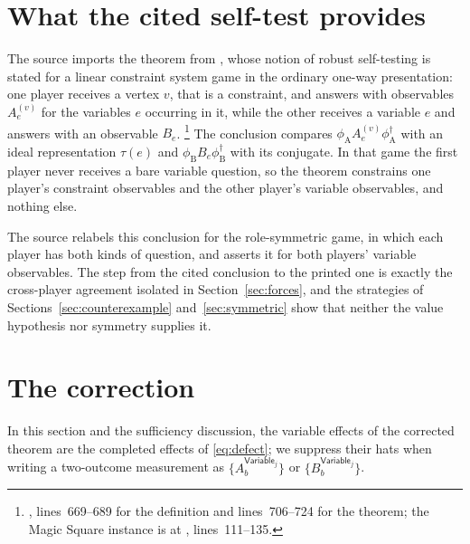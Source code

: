 \documentclass[11pt]{article}
\newcommand{\Variable}{\mathsf{Variable}}
\begin{document}
\section{What the cited self-test provides}

The source imports the theorem from \cite[Theorem~6.9]{Coladangelo2017Robust},
whose notion of robust self-testing is stated for a linear constraint system
game in the ordinary one-way presentation: one player receives a vertex $v$,
that is a constraint, and answers with observables $A^{(v)}_e$ for the
variables $e$ occurring in it, while the other receives a variable $e$ and
answers with an observable $B_e$.%
\footnote{, lines~669--689 for the
definition and lines~706--724 for the theorem; the Magic Square instance is at
, lines~111--135.}
The conclusion compares $\phi_{\mathrm A} A^{(v)}_e \phi_{\mathrm A}^\dagger$
with an ideal representation $\tau(e)$ and
$\phi_{\mathrm B} B_e \phi_{\mathrm B}^\dagger$ with its conjugate.  In that
game the first player never receives a bare variable question, so the theorem
constrains one player's constraint observables and the other player's variable
observables, and nothing else.

The source relabels this conclusion for the role-symmetric game, in which each
player has both kinds of question, and asserts it for both players' variable
observables.  The step from the cited conclusion to the printed one is exactly
the cross-player agreement isolated in Section~\ref{sec:forces}, and the
strategies of Sections~\ref{sec:counterexample} and~\ref{sec:symmetric} show
that neither the value hypothesis nor symmetry supplies it.

\section{The correction}
\label{sec:repair}

In this section and the sufficiency discussion, the variable effects of the
corrected theorem are the completed effects of \eqref{eq:defect}; we suppress
their hats when writing a two-outcome measurement as
$\{A^{\Variable_j}_b\}$ or $\{B^{\Variable_j}_b\}$.
\end{document}

